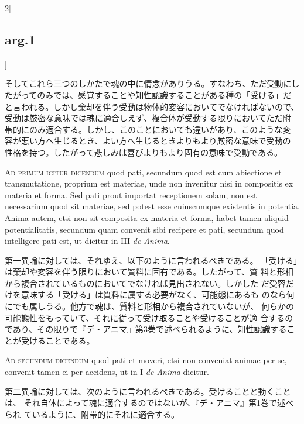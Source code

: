 \documentclass[paper=a4paper,fontsize=10pt,jafontsize=9pt,titlepage]{jlreq}
\begin{document}
\begin{paracol}{2}[\subsection{arg.1}]
\switchcolumn

そしてこれら三つのしかたで魂の中に情念がありうる。すなわち、ただ受動にし
 たがってのみでは、感覚することや知性認識することがある種の「受ける」だ
 と言われる。しかし棄却を伴う受動は物体的変容においてでなければないので、
 受動は厳密な意味では魂に適合しえず、複合体が受動する限りにおいてただ附
 帯的にのみ適合する。しかし、このことにおいても違いがあり、このような変
 容が悪い方へ生じるとき、よい方へ生じるときよりもより厳密な意味で受動の
 性格を持つ。したがって悲しみは喜びよりもより固有の意味で受動である。

\switchcolumn*[\subsection{ad.1}]

{\scshape Ad primum igitur dicendum} quod pati, secundum quod est cum abiectione et
 transmutatione, proprium est materiae, unde non invenitur nisi in
 compositis ex materia et forma. Sed pati prout importat receptionem
 solam, non est necessarium quod sit materiae, sed potest esse
 cuiuscumque existentis in potentia. Anima autem, etsi non sit composita
 ex materia et forma, habet tamen aliquid potentialitatis, secundum quam
 convenit sibi recipere et pati, secundum quod intelligere pati est, ut
 dicitur in III {\itshape de Anima}.

\switchcolumn

第一異論に対しては、それゆえ、以下のように言われるべきである。
「受ける」は棄却や変容を伴う限りにおいて質料に固有である。したがって、質
 料と形相から複合されているものにおいてでなければ見出されない。しかした
 だ受容だけを意味する「受ける」は質料に属する必要がなく、可能態にあるも
 のなら何にでも属しうる。他方で魂は、質料と形相から複合されていないが、
 何らかの可能態性をもっていて、それに従って受け取ることや受けることが適
 合するのであり、その限りで『デ・アニマ』第3巻で述べられるように、知性認識することが受けることである。

\switchcolumn*[\subsection{ad.2}]

{\scshape Ad secundum dicendum} quod pati et moveri, etsi non conveniat animae per
 se, convenit tamen ei per accidens, ut in I {\itshape de Anima} dicitur.

\switchcolumn

第二異論に対しては、次のように言われるべきである。受けることと動くことは、
 それ自体によって魂に適合するのではないが、『デ・アニマ』第1巻で述べられ
 ているように、附帯的にそれに適合する。


\end{paracol}
\end{document}
